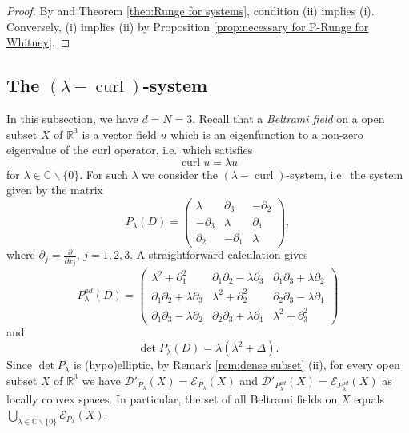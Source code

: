 \documentclass[a4paper,10pt]{amsart}
\newtheorem*{crucial lemma}{Lemma \ref{lem:nice polynomial2}}
\theoremstyle{definition}
\newcommand{\R}{\mathbb{R}}
\newcommand{\C}{\mathbb{C}}
\newcommand{\Pad}{P^{ad}}
\newcommand{\detP}{\operatorname{det}\!P}
\newcommand{\curl}{\operatorname{curl}}
\begin{document}
\begin{proof}
    By \cite[Theorem 12]{CiasKalmes2025} and Theorem \ref{theo:Runge for systems}, condition (ii) implies (i). Conversely, (i) implies (ii) by Proposition \ref{prop:necessary for P-Runge for Whitney}.
\end{proof}


\subsection{The \texorpdfstring{$(\lambda-\curl)$}{lambda-curl}-system}\label{subsec:curl}

In this subsection, we have $d=N=3$. Recall that a \emph{Beltrami field} on a open subset $X$ of $\R^3$ is a vector field $u$ which is an eigenfunction to a non-zero eigenvalue of the curl operator, i.e.~which satisfies
\[\curl u = \lambda u\]
for $\lambda\in\C\backslash \{0\}$. For such $\lambda$ we consider the $(\lambda-\curl)$-system, i.e.~the system given by the matrix
\begin{equation}\label{eq:curl matrix}
	P_\lambda(D)=\begin{pmatrix}
			\lambda & \partial_3 & -\partial_2\\
			-\partial_3 & \lambda & \partial_1\\
			\partial_2 & -\partial_1 & \lambda
		\end{pmatrix},
\end{equation}
where $\partial_j=\frac{\partial}{\partial x_j}$, $j=1,2,3$. A straightforward calculation gives
\begin{equation*}
	\Pad_\lambda(D)=\begin{pmatrix}
		\lambda^2+\partial_1^2 & \partial_1\partial_2 - \lambda\partial_3 & \partial_1\partial_3+\lambda\partial_2\\
		\partial_1\partial_2+\lambda\partial_3 & \lambda^2+\partial_2^2& \partial_2\partial_3 - \lambda\partial_1\\
		\partial_1\partial_3-\lambda\partial_2 & \partial_2\partial_3 + \lambda\partial_1 & \lambda^2+\partial_3^2
	\end{pmatrix}
\end{equation*}
and
\begin{equation}\label{eq:det curl}
	\detP_\lambda(D)=\lambda(\lambda^2+\Delta).
\end{equation}
Since $\detP_\lambda$ is (hypo)elliptic, by Remark \ref{rem:dense subset} (ii), for every open subset $X$ of $\R^3$ we have  $\mathscr{D}'_{P_\lambda}(X)=\mathscr{E}_{P_\lambda}(X)$ and $\mathscr{D}'_{\Pad_\lambda}(X)=\mathscr{E}_{\Pad_\lambda}(X)$ as locally convex spaces. In particular, the set of all Beltrami fields on $X$ equals $\bigcup_{\lambda\in\C\backslash\{0\}}\mathscr{E}_{P_\lambda}(X)$. 
\end{document}
